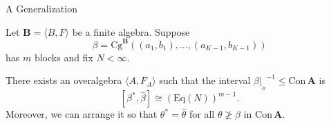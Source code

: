 \documentclass[xcolor=dvipsnames,9pt]{beamer}
\newcommand{\bA}{\ensuremath{\mathbf{A}}}
\newcommand{\bB}{\ensuremath{\mathbf{B}}}
\newcommand{\sE}{\ensuremath{\mathcal{E}}}
\newcommand{\sO}{\ensuremath{\mathcal{O}}}
\newcommand{\resB}{\ensuremath{|_{_B}}}
\newcommand{\Cg}{\ensuremath{\mathrm{Cg}}}
\newcommand{\Con}{\ensuremath{\mathrm{Con}\,}}
\newcommand{\Eq}{\mbox{Eq}}
\renewcommand{\leq}{\ensuremath{\leqslant}}
\newcommand{\<}{\langle}	     %
\renewcommand{\>}{\rangle}	     %
\begin{document}
\begin{frame}[fragile,label=OAextension2,shrink=5]{A Generalization}

\begin{theorem}
Let $\bB = \<B, F\>$ be a finite algebra. Suppose
\[
\beta = \Cg^{\bB}((a_1, b_1), \dots, (a_{K-1},b_{K-1}))
\]
has $m$ blocks and fix $N<\infty$.

\vskip3mm

There exists an overalgebra $\<A, F_A\>$
such that the interval $\beta\resB^{-1} \leq \Con \bA$ is 
\[
[\beta^*, \widehat{\beta}] \cong (\Eq (N))^{m-1}.
\]
Moreover, we can arrange it so that $\theta^* = \widehat{\theta}$ for all $\theta \ngeq \beta$ in $\Con \bA$.
\end{theorem}




\end{frame}
\end{document}

